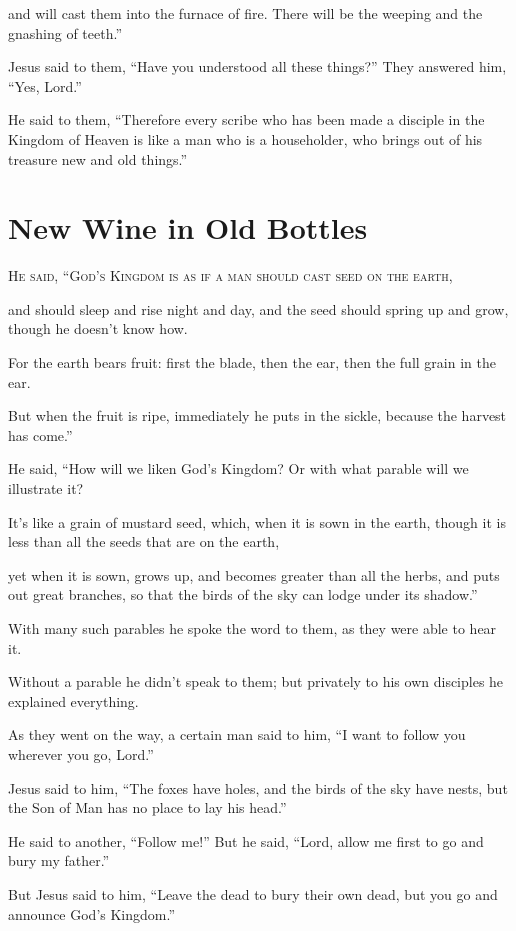 and will cast them into the furnace of fire. There will be the weeping and the gnashing of teeth.”

Jesus said to them, “Have you understood all these things?” They answered him, “Yes, Lord.”

He said to them, “Therefore every scribe who has been made a disciple in the Kingdom of Heaven is like a man who is a householder, who brings out of his treasure new and old things.”


\clearpage \section*{New Wine in Old Bottles}
\chapterornament

\lettrine{H}{e said, “God’s Kingdom is as if a man should cast seed on the earth,}

and should sleep and rise night and day, and the seed should spring up and grow, though he doesn’t know how.

For the earth bears fruit: first the blade, then the ear, then the full grain in the ear.

But when the fruit is ripe, immediately he puts in the sickle, because the harvest has come.”

He said, “How will we liken God’s Kingdom? Or with what parable will we illustrate it?

It’s like a grain of mustard seed, which, when it is sown in the earth, though it is less than all the seeds that are on the earth,

yet when it is sown, grows up, and becomes greater than all the herbs, and puts out great branches, so that the birds of the sky can lodge under its shadow.”

With many such parables he spoke the word to them, as they were able to hear it.

Without a parable he didn’t speak to them; but privately to his own disciples he explained everything.

As they went on the way, a certain man said to him, “I want to follow you wherever you go, Lord.”

Jesus said to him, “The foxes have holes, and the birds of the sky have nests, but the Son of Man has no place to lay his head.”

He said to another, “Follow me!” But he said, “Lord, allow me first to go and bury my father.”

But Jesus said to him, “Leave the dead to bury their own dead, but you go and announce God’s Kingdom.”

